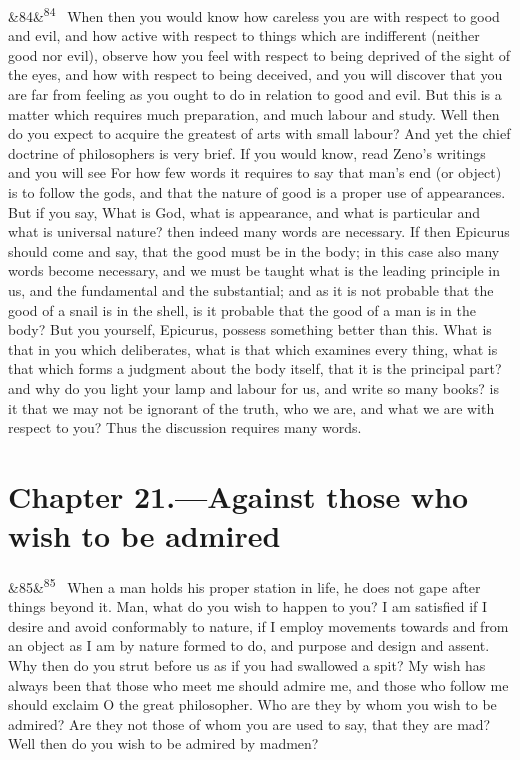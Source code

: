 \documentclass[12pt]{article}
\newcommand{\para}[1][]{\par\noindent\ifx&#1&\else\textsuperscript{\footnotesize #1}~\fi}
\begin{document}
\para[84] When then you would know how careless you are with respect to good and evil, and how active with respect to things which are indifferent (neither good nor evil), observe how you feel with respect to being deprived of the sight of the eyes, and how with respect to being deceived, and you will discover that you are far from feeling as you ought to do in relation to good and evil. But this is a matter which requires much preparation, and much labour and study. Well then do you expect to acquire the greatest of arts with small labour? And yet the chief doctrine of philosophers is very brief. If you would know, read Zeno's writings and you will see For how few words it requires to say that man's end (or object) is to follow the gods, and that the nature of good is a proper use of appearances. But if you say, What is God, what is appearance, and what is particular and what is universal nature? then indeed many words are necessary. If then Epicurus should come and say, that the good must be in the body; in this case also many words become necessary, and we must be taught what is the leading principle in us, and the fundamental and the substantial; and as it is not probable that the good of a snail is in the shell, is it probable that the good of a man is in the body? But you yourself, Epicurus, possess something better than this. What is that in you which deliberates, what is that which examines every thing, what is that which forms a judgment about the body itself, that it is the principal part? and why do you light your lamp and labour for us, and write so many books? is it that we may not be ignorant of the truth, who we are, and what we are with respect to you? Thus the discussion requires many words.

\section*{Chapter 21.---Against those who wish to be admired}

\para[85] When a man holds his proper station in life, he does not gape after things beyond it. Man, what do you wish to happen to you? I am satisfied if I desire and avoid conformably to nature, if I employ movements towards and from an object as I am by nature formed to do, and purpose and design and assent. Why then do you strut before us as if you had swallowed a spit? My wish has always been that those who meet me should admire me, and those who follow me should exclaim O the great philosopher. Who are they by whom you wish to be admired? Are they not those of whom you are used to say, that they are mad? Well then do you wish to be admired by madmen?
\end{document}
